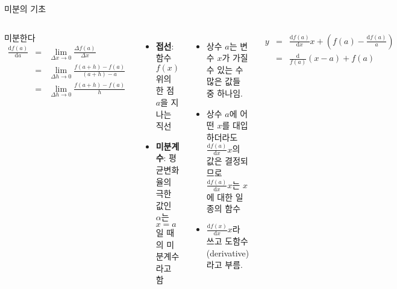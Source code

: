 \documentclass[10pt,t]{beamer}
\begin{document}
\begin{frame}{미분의 기초}
\begin{columns}
\end{columns}
\pagebreak
\begin{columns}
     \vspace{-2em}
    \begin{block}{미분한다}
        \begin{eqnarray*}
            \frac{\text{d}f(a)}{\text{d}a} &=& \lim _{\Delta x \rightarrow 0} \frac{\Delta f(a)}{\Delta x} \\
            &=& \lim _{\Delta h \rightarrow 0} \frac{f(a+h)-f(a)}{(a+h)-a} \\
            &=&  \lim _{\Delta h \rightarrow 0} \frac{f(a+h)-f(a)}{h}
        \end{eqnarray*}
            
    \end{block}
    \begin{itemize}
        \item \textbf{접선}: 함수 $f(x)$위의 한 점 $a$을 지나는 직선
        \item \textbf{미분계수}: 평균변화율의 극한 값인 $\alpha$는 $x=a$일 때의 미분계수라고 함
    \end{itemize}
    \begin{itemize}
        \item 상수 $a$는 변수 $x$가 가질 수 있는 수 많은 값들 중 하나임. 
        \item 상수 $a$에 어떤 $x$를 대입하더라도 $\frac{\text{d}f(a)}{\text{d}x}x$의 값은 결정되므로 $\frac{\text{d}f(a)}{\text{d}x}x$는 $x$에 대한 일종의 함수
        \item $\frac{\text{d}f(x)}{\text{d}x}x$라 쓰고 도함수(derivative)라고 부름.
    
    \end{itemize}
    \begin{eqnarray*}
        y &=& \frac{\text{d}f(a)}{\text{d}x}x + \left( f(a)- \frac{\text{d}f(a)}{a} \right)\\
        &=& \frac{\text{d}}{f(a)}(x-a)+f(a)
    \end{eqnarray*}
\end{columns}
\end{frame}
\end{document}
